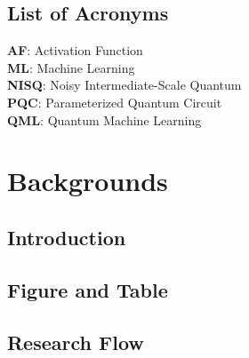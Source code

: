\documentclass[12pt]{report}
\begin{document}
\chapter*{List of Acronyms}
\noindent\textbf{AF}: Activation Function
\\
\noindent\textbf{ML}: Machine Learning
\\
\noindent\textbf{NISQ}: Noisy Intermediate-Scale Quantum
\\
\noindent\textbf{PQC}: Parameterized Quantum Circuit
\\
\noindent\textbf{QML}: Quantum Machine Learning

\clearpage

\part{Backgrounds}\label{part-bkg}

\chapter{Introduction}\label{c:intro}


\chapter{Figure and Table}

\chapter{Research Flow}
\end{document}
